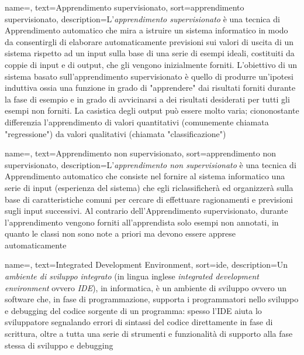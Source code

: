 {
    name=,
    text=Apprendimento supervisionato,
    sort=apprendimento supervisionato,
    description={L'\textit{apprendimento supervisionato} è una tecnica di \gls{Apprendimento automatico} che mira a istruire un sistema informatico in modo da consentirgli di elaborare automaticamente previsioni sui valori di uscita di un sistema rispetto ad un input sulla base di una serie di esempi ideali, costituiti da coppie di input e di output, che gli vengono inizialmente forniti. L'obiettivo di un sistema basato sull'apprendimento supervisionato è quello di produrre un'ipotesi induttiva ossia una funzione in grado di "apprendere" dai risultati forniti durante la fase di esempio e in grado di avvicinarsi a dei risultati desiderati per tutti gli esempi non forniti. La casistica degli output può essere molto varia; ciononostante differenzia l'apprendimento di valori quantitativi (comunemente chiamata "regressione") da valori qualitativi (chiamata "classificazione")
}
}

{
    name=,
    text=Apprendimento non supervisionato,
    sort=apprendimento non supervisionato,
    description={L'\textit{apprendimento non supervisionato} è una tecnica di \gls{Apprendimento automatico} che consiste nel fornire al sistema informatico una serie di input (esperienza del sistema) che egli riclassificherà ed organizzerà sulla base di caratteristiche comuni per cercare di effettuare ragionamenti e previsioni sugli input successivi. Al contrario dell'\gls{Apprendimento supervisionato}, durante l'apprendimento vengono forniti all'apprendista solo esempi non annotati, in quanto le classi non sono note a priori ma devono essere apprese automaticamente
}
}

{
    name=,
    text=Integrated Development Environment,
    sort=ide,
    description={Un \textit{ambiente di sviluppo integrato} (in lingua inglese \textit{integrated development environment} ovvero \textit{IDE}), in informatica, è un ambiente di sviluppo ovvero un software che, in fase di programmazione, supporta i programmatori nello sviluppo e debugging del codice sorgente di un programma: spesso l'IDE aiuta lo sviluppatore segnalando errori di sintassi del codice direttamente in fase di scrittura, oltre a tutta una serie di strumenti e funzionalità di supporto alla fase stessa di sviluppo e debugging}
}

